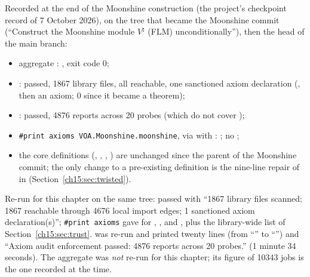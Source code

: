 \begin{status}
Recorded at the end of the Moonshine construction (the project's checkpoint record of 7 October 2026),
on the tree that became the Moonshine commit (``Construct the Moonshine module $V^\natural$ (FLM)
unconditionally''), then the head of the main branch:
\begin{itemize}
\item aggregate : , exit code 0;
\item {}: passed, 1867 library files, all reachable, one sanctioned
  axiom declaration (, then an axiom; 0 since it became a theorem);
\item {}: passed, 4876 reports across 20 probes (which do not
  cover );
\item \texttt{\#print axioms VOA.Moonshine.moonshine}, via  with
  : ; no ;
\item the core definitions (, ,
  , ) are unchanged since
  the parent of the Moonshine commit; the only change to a pre-existing definition is the
  nine-line repair of  in 
  (Section~\ref{ch15:sec:twisted}).
\end{itemize}
Re-run for this chapter on the same tree:  passed with
``1867 library files scanned; 1867 reachable through 4676 local import edges; 1 sanctioned axiom
declaration(s)''; \texttt{\#print axioms} gave  for
, , 
and , plus the library-wide list of
Section~\ref{ch15:sec:trust}.  was re-run and printed twenty
 lines (from ``''
to ``'') and
``Axiom audit enforcement passed: 4876 reports across 20 probes.'' (1 minute 34 seconds). The
aggregate  was \emph{not} re-run for this chapter; its figure of 10343 jobs is the
one recorded at the time.
\end{status}

